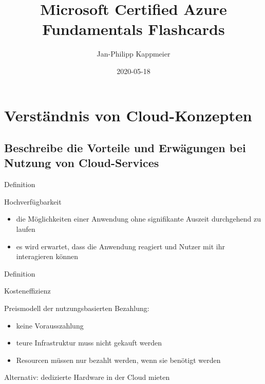 \documentclass{scrartcl}
\newenvironment{flashcard}[2][]{%
    #1
    \vfill
    \centerline{\Large{#2}}
    \vfill
\newpage
}
{\newpage}
\newcommand{\sectioncard}[1]{
    \vspace*{\stretch{1}}
    \section{#1}
    \vspace*{\stretch{1}}
    \pagebreak
}
\newcommand{\subsectioncard}[1]{
    \vspace*{\stretch{1}}
    \subsection{#1}
    \vspace*{\stretch{1}}
    \pagebreak
}
\begin{document}
    \title{Microsoft Certified Azure Fundamentals Flashcards}
    \date{2020-05-18}
    \author{Jan-Philipp Kappmeier}

    \clearpage\maketitle
    \thispagestyle{empty}
    \pagebreak

    \sectioncard{Verständnis von Cloud-Konzepten}

    \subsectioncard{Beschreibe die Vorteile und Erwägungen bei Nutzung von Cloud-Services}

    \begin{flashcard}[Definition]{Hochverfügbarkeit}
        \begin{itemize}
            \item die Möglichkeiten einer Anwendung ohne signifikante Auszeit durchgehend zu laufen
            \item es wird erwartet, dass die Anwendung reagiert und Nutzer mit ihr interagieren können
        \end{itemize}
    \end{flashcard}

    \begin{flashcard}[Definition]{Kosteneffizienz}
        Preismodell der nutzungsbasierten Bezahlung:
        \begin{itemize}
            \item keine Vorausszahlung
            \item teure Infrastruktur muss nicht gekauft werden
            \item Resourcen müssen nur bezahlt werden, wenn sie benötigt werden
        \end{itemize}

        \vspace{5mm}
        Alternativ: dedizierte Hardware in der Cloud mieten
    \end{flashcard}
\end{document}
